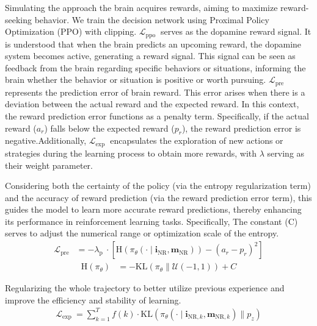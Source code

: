 Simulating the approach the brain acquires rewards, aiming to maximize reward-seeking behavior. We train the decision network using Proximal Policy Optimization (PPO) \cite{schulman2017proximal} with clipping. $\mathcal{L}_{\text {ppo }}$ serves as the dopamine reward signal. It is understood that when the brain predicts an upcoming reward, the dopamine system becomes active, generating a reward signal. This signal can be seen as feedback from the brain regarding specific behaviors or situations, informing the brain whether the behavior or situation is positive or worth pursuing. $\mathcal{L}_{\text {pre }}$ represents the prediction error of brain reward. This error arises when there is a deviation between the actual reward and the expected reward. In this context, the reward prediction error functions as a penalty term. Specifically, if the actual reward ($a_{r}$) falls below the expected reward ($p_{r}$), the reward prediction error is negative.Additionally, $\mathcal{L}_{\text {exp }}$ encapsulates the exploration of new actions or strategies during the learning process to obtain more rewards, with $\lambda$ serving as their weight parameter.

Considering both the certainty of the policy (via the entropy regularization term) and the accuracy of reward prediction (via the reward prediction error term), this guides the model to learn more accurate reward predictions, thereby enhancing its performance in reinforcement learning tasks. Specifically, The constant (C) serves to adjust the numerical range or optimization scale of the entropy.
\begin{align}
	\mathcal{L}_{\text{pre}} & = -\lambda_{\text {p }} \cdot [\mathrm{H}\left(\pi_{\theta}\left(\cdot \mid \mathbf{i}_{\mathrm{NR}}, \mathbf{m}_{\mathrm{NR}}\right)\right) - (a_{r} - p_{r})^{2}]
\end{align}
\begin{align}
	\mathrm{H}\left(\pi_{\theta}\right) & = -\mathrm{KL}\left(\pi_{\theta} \| \mathcal{U}(-1,1)\right)+C
\end{align}

Regularizing the whole trajectory to better utilize previous experience and improve the efficiency and stability of learning.
\begin{align}
    \mathcal{L}_{\text {exp }}=\sum_{k=1}^{T} f(k) \cdot \mathrm{KL}\left(\pi_{\theta}\left(\cdot \mid \mathbf{i}_{\mathrm{NR}, k}, \mathbf{m}_{\mathrm{NR}, k}\right) \| p_{z}\right)
\end{align}


